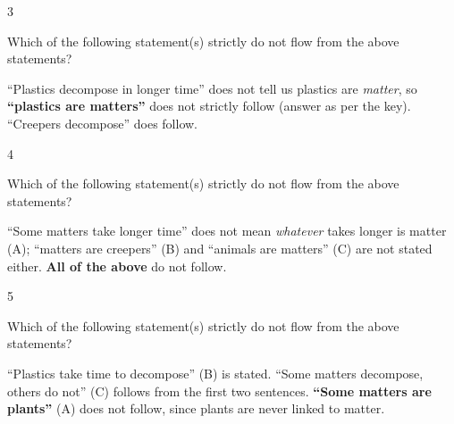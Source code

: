 \begin{question}{3}
{Which of the following statement(s) strictly do not flow from the above statements?\par}
\begin{explain}
``Plastics decompose in longer time'' does not tell us plastics are \emph{matter}, so \textbf{``plastics are matters''} does not strictly follow (answer as per the key). ``Creepers decompose'' does follow.
\end{explain}
\end{question}

\begin{question}{4}
{Which of the following statement(s) strictly do not flow from the above statements?\par}
\begin{explain}
``Some matters take longer time'' does not mean \emph{whatever} takes longer is matter (A); ``matters are creepers'' (B) and ``animals are matters'' (C) are not stated either. \textbf{All of the above} do not follow.
\end{explain}
\end{question}

\begin{question}{5}
{Which of the following statement(s) strictly do not flow from the above statements?\par}
\begin{explain}
``Plastics take time to decompose'' (B) is stated. ``Some matters decompose, others do not'' (C) follows from the first two sentences. \textbf{``Some matters are plants''} (A) does not follow, since plants are never linked to matter.
\end{explain}
\end{question}

